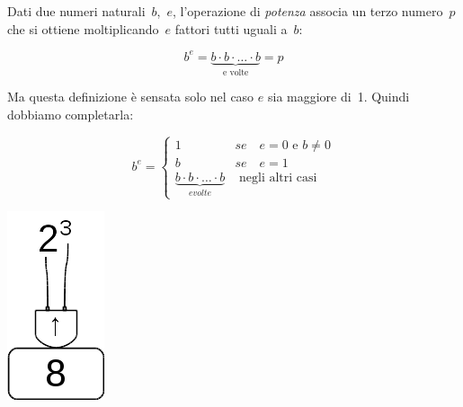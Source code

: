 \begin{definizione}
Dati due numeri naturali~\(b\),~\(e\), l'operazione di \emph{potenza} 
associa un terzo numero~\(p\) che si ottiene moltiplicando~\(e\) fattori tutti 
uguali a~\(b\):
\begin{inaccessibleblock}[
  \[b^e = \mbox{e volte}{b \cdot b \cdot  \dots  \cdot b} = p\]
  ]
\[b^e = \underbrace{b \cdot b \cdot \dots \cdot b}_{\text{e volte}} = p\]
\end{inaccessibleblock}

\end{definizione}

Ma questa definizione è sensata solo nel caso \(e\) sia maggiore di~1.
Quindi dobbiamo completarla:

\begin{inaccessibleblock}[
  \begin{definizione}
    \[
    b^e = \begin{cases}
    1 & se \quad e = 0 \text{ e } b\neq 0\\
    b & se \quad e = 1\\
    \mbox{e volte}{b \cdot b \cdot \dots \cdot b} & \mbox{ 
negli altri casi}
    \end{cases}\]
  \end{definizione}
  ]
  \begin{definizione}
    \[
    b^e = \begin{cases}
    1 & se \quad e = 0 \text{ e } b\neq 0\\
    b & se \quad e = 1\\
    \underbrace{b \cdot b \cdot \dots \cdot b}_{e volte} & 
\text{ negli altri casi}
    \end{cases}\]
  \end{definizione}
\end{inaccessibleblock}


\begin{inaccessibleblock}[]
\begin{minipage}{0.80\textwidth}
 \centering
   
\end{minipage}%
\begin{minipage}{0.15\textwidth}
 \centering
 \includegraphics[scale=0.35]{img/op_pot.png}
\end{minipage}%
\end{inaccessibleblock}

